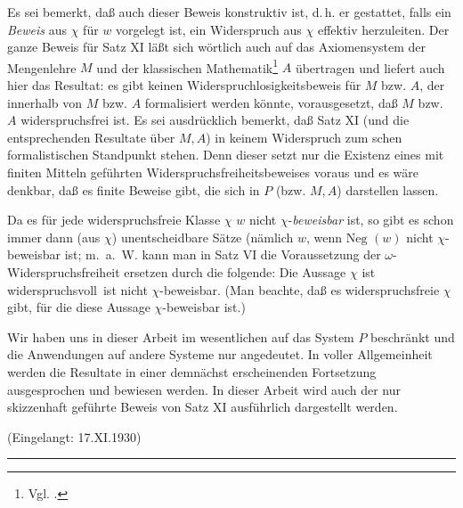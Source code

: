 \documentclass[draft]{scrartcl}
\newcounter{commentaryNumber}
\begin{document}
Es sei bemerkt, daß auch dieser Beweis konstruktiv ist, d.\,h. er 
gestattet, falls ein \textit{Beweis} aus $\chi$ für $w$ vorgelegt ist, ein Widerspruch aus $\chi$ effektiv 
herzuleiten. Der ganze Beweis für Satz XI läßt sich wörtlich auch auf das Axiomensystem 
der Mengenlehre $M$ und der klassischen 
Mathematik\footnote{Vgl. .}
$A$ übertragen und liefert auch hier das Resultat: es gibt keinen
Widerspruchlosigkeitsbeweis für $M$ bzw. $A$, der innerhalb von $M$ bzw. $A$ formalisiert werden könnte, vorausgesetzt,
daß $M$ bzw. $A$ widerspruchsfrei ist. Es sei ausdrücklich bemerkt, daß Satz XI
(und die entsprechenden Resultate über $M, A$) in keinem Widerspruch zum schen
formalistischen Standpunkt stehen. Denn dieser setzt nur die Existenz eines mit finiten
Mitteln geführten Widerspruchsfreiheitsbeweises voraus und es wäre denkbar, daß es finite
Beweise gibt, die sich in $P$ (bzw. $M, A$)  darstellen lassen.

Da es für jede widerspruchsfreie Klasse $\chi$ $w$ nicht
$\chi$-\textit{beweisbar} ist, so gibt es schon immer dann
(aus $\chi$) unentscheidbare Sätze (nämlich $w$, wenn
$\text{Neg }\left(w\right)$ nicht $\chi$-beweisbar ist;
m.~a.~W. kann man in Satz VI die Voraussetzung der
$\omega$-Widerspruchsfreiheit ersetzen durch die folgende:
Die Aussage \glqq $\chi$ ist widerspruchsvoll\grqq\ ist
nicht $\chi$-beweisbar. (Man beachte, daß es widerspruchsfreie
$\chi$ gibt, für die diese Aussage $\chi$-beweisbar ist.)

Wir haben uns in dieser Arbeit im wesentlichen auf das System $P$
beschränkt und die Anwendungen auf andere Systeme nur angedeutet.
In voller Allgemeinheit werden die Resultate in einer demnächst
erscheinenden Fortsetzung ausgesprochen und bewiesen werden.
In dieser Arbeit wird auch der nur skizzenhaft geführte Beweis
von Satz XI ausführlich dargestellt werden.

\begin{center}
(Eingelangt: 17.XI.1930)
\end{center}
\vspace{0.5cm}
\begin{center}
\rule{2cm}{0.01cm}
\end{center}

\newpage

\printbibliography[keyword={goedel}]
\end{document}
